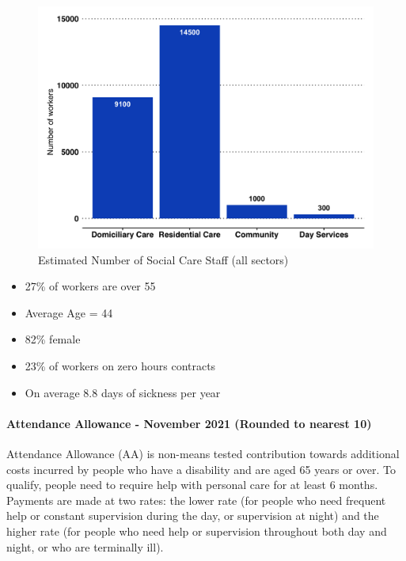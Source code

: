 \begin{figure}[h]
    \caption{Estimated Number of Social Care Staff (all sectors)}\label{fig:sc-workforce}
    \centering
    \includegraphics[width = \linewidth]{images/03-sc-workforce.png}
\end{figure}

\begin{itemize}[noitemsep]
    \item 27\% of workers are over 55
    \item Average Age = 44
    \item 82\% female
    \item 23\% of workers on zero hours contracts
    \item On average 8.8 days of sickness per year
\end{itemize}
   
\paragraph{Attendance Allowance - November 2021 (Rounded to nearest 10)} Attendance Allowance (AA) is non-means tested contribution towards additional costs incurred by people who have a disability and are aged 65 years or over. To qualify, people need to require help with personal care for at least 6 months. Payments are made at two rates: the lower rate (for people who need frequent help or constant supervision during the day, or supervision at night) and the higher rate (for people who need help or supervision throughout both day and night, or who are terminally ill).

